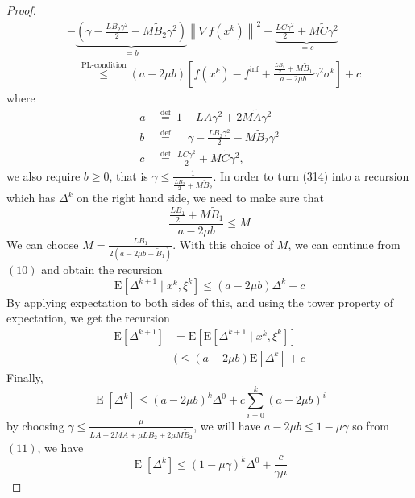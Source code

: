 \documentclass[12pt,a4paper]{article}
\DeclareMathOperator{\E}{\mathrm{E}}
\begin{document}
\begin{proof}
\begin{equation}
\begin{aligned}
		&-\underbrace{\left(\gamma-\frac{L B_{2} \gamma^{2}}{2}-M \tilde{B}_{2} \gamma^{2}\right)}_{=b}\left\|\nabla f\left(x^{k}\right)\right\|^{2}+\underbrace{\frac{L C \gamma^{2}}{2}+M \tilde{C} \gamma^{2}}_{=c}\\
	&  \quad \stackrel{\text{PL-condition}}{\leq}  (a-2\mu b)\left[f\left(x^{k}\right)-f^{\mathrm{inf}}+\frac{\frac{L B_{1}}{2}+M \tilde{B}_{1}}{a-2\mu b} \gamma^{2} \sigma^{k}\right]+c	
 \end{aligned}
	\end{equation}
	where 
	$$
	\begin{array}{ll}
		a & \stackrel{\text { def }}{=} 1+L A \gamma^{2}+2 M \tilde{A} \gamma^{2} \\
		b & \stackrel{\text { def }}{=} \quad \gamma-\frac{L B_{2} \gamma^{2}}{2}-M \tilde{B}_{2} \gamma^{2} \\
		c & \stackrel{\text { def }}{=} \frac{L C \gamma^{2}}{2}+M \tilde{C} \gamma^{2},
	\end{array}
	$$
	we also require $b\geq 0$, that is $\gamma\leq \frac{1}{\frac{LB_2}{2}+M\tilde{B}_2}$.
	In order to turn (314) into a recursion which has $\Delta^{k}$ on the right hand side, we need to make sure that
	$$
	\frac{\frac{L B_{1}}{2}+M \tilde{B}_{1}}{a-2\mu b} \leq M
	$$
	We can choose $M=\frac{LB_1}{2(a-2\mu b-\tilde{B}_1)}$.
	With this choice of $M$, we can continue from $(10)$ and obtain the recursion
	\begin{equation}
	\mathrm{E}\left[\Delta^{k+1} \mid x^{k}, \xi^{k}\right] \leq  (a-2\mu b) \Delta^{k}+c
	\end{equation}
	By applying expectation to both sides of this, and using the tower property of expectation, we get the recursion
	$$
	\begin{aligned}
		\mathrm{E}\left[\Delta^{k+1}\right] &=\mathrm{E}\left[\mathrm{E}\left[\Delta^{k+1} \mid x^{k}, \xi^{k}\right]\right] \\
		&(\leq (a-2\mu b) \mathrm{E}\left[\Delta^{k}\right]+c
	\end{aligned}
	$$
	Finally,
	\begin{equation}
		\E\left[\Delta^{k}\right]\leq (a-2\mu b)^k\Delta^0+c\sum_{i=0}^{k}(a-2\mu b)^i
	\end{equation}
	by choosing $\gamma\leq \frac{\mu}{LA+2MA+\mu L B_2+2\mu M\tilde{B}_2}$, we will have $a-2\mu b\leq 1-\mu\gamma$
	so from $(11)$, we have 
	\begin{equation}
		\E\left[\Delta^k\right]\leq (1-\mu\gamma)^k\Delta^0+\frac{c}{\gamma \mu}
	\end{equation}
	\end{proof}
	
\end{document}

